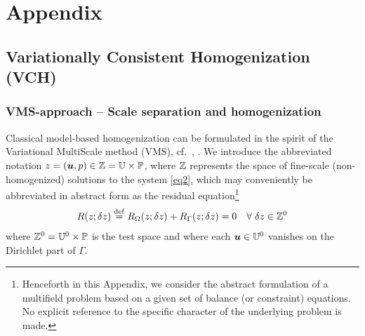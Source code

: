 \documentclass{bmcart}
\newcommand{\eqtref}[1]{\eqref{#1}}
\begin{document}

%
%

%
%
%

\appendix
\setcounter{equation}{0}
\renewcommand{\theequation}{A-\arabic{equation}}

\section{Appendix}

\subsection{Variationally Consistent Homogenization (VCH)}
\label{appendix:1}

\subsubsection{VMS-approach -- Scale separation and homogenization}

Classical model-based homogenization can be formulated in the spirit of the Variational MultiScale method (VMS), cf.\ \cite{hughes_variational_1998}, \cite{larson_adaptive_2007}.
We introduce the abbreviated notation $z = (\boldsymbol{u}, p) \in \mathbb{Z} = \mathbb{U} \times \mathbb{P}$, where $\mathbb{Z}$ represents the space of fine-scale (non-homogenized) solutions to the system \eqtref{eq2},
which may conveniently be abbreviated in abstract form as the residual equation\footnote{Henceforth in this Appendix, we consider the abstract formulation of a multifield problem based on a given set of balance (or constraint) equations.
No explicit reference to the specific character of the underlying problem is made.}
\begin{align}
 R(z; \delta z) \defeq R_\Omega(z; \delta z) + R_\Gamma(z;\delta z) = 0\quad \forall\;\delta z\in \set Z^0
\label{eq:A1}
\end{align}
where $\mathbb{Z}^0 = \mathbb{U}^0 \times \mathbb{P}$ is the test space and where each $\boldsymbol{u}\in \mathbb{U}^0$ vanishes on the Dirichlet part of $\Gamma$.
\end{document}
